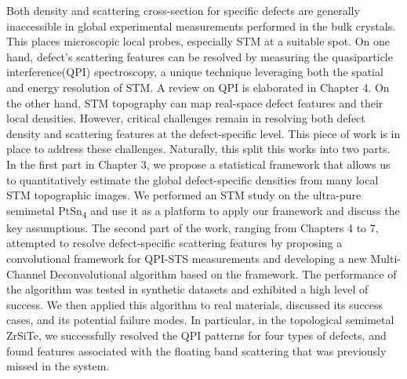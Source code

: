 Both density and scattering cross-section for specific defects are generally inaccessible in global experimental measurements performed in the bulk crystals. This places microscopic local probes, especially \ac{STM} at a suitable spot. On one hand, defect's scattering features can be resolved by measuring the quasiparticle interference(QPI) spectroscopy, a unique technique leveraging both the spatial and energy resolution of \ac{STM}. A review on \ac{QPI} is elaborated in Chapter 4. On the other hand, \ac{STM} topography can map real-space defect features and their local densities. However, critical challenges remain in resolving both defect density and scattering features at the defect-specific level. This piece of work is in place to address these challenges. Naturally, this split this works into two parts. In the first part in Chapter 3, we propose a statistical framework that allows us to quantitatively estimate the global defect-specific densities from many local \ac{STM} topographic images. We performed an \ac{STM} study on the ultra-pure semimetal PtSn\textsubscript{4} and use it as a platform to apply our framework and discuss the key assumptions. The second part of the work, ranging from Chapters 4 to 7, attempted to resolve defect-specific scattering features by proposing a convolutional framework for QPI-STS measurements and developing a new Multi-Channel Deconvolutional algorithm based on the framework. The performance of the algorithm was tested in synthetic datasets and exhibited a high level of success. We then applied this algorithm to real materials, discussed its success cases, and its potential failure modes. In particular, in the topological semimetal ZrSiTe, we successfully resolved the \ac{QPI} patterns for four types of defects, and found features associated with the floating band scattering that was previously missed in the system\cite{stuartQuasiparticleInterferenceObservation2022}.  